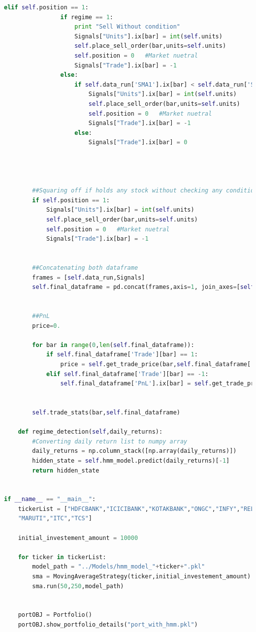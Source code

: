 \documentclass{report}
\begin{document}
\begin{lstlisting}[language=Python]
			elif self.position == 1:
				if regime == 1:
					print "Sell Without condition"
					Signals["Units"].ix[bar] = int(self.units)
					self.place_sell_order(bar,units=self.units)
					self.position = 0   #Market nuetral
					Signals["Trade"].ix[bar] = -1
				else:
					if self.data_run['SMA1'].ix[bar] < self.data_run['SMA2'].ix[bar]:
						Signals["Units"].ix[bar] = int(self.units)
						self.place_sell_order(bar,units=self.units)
						self.position = 0   #Market nuetral
						Signals["Trade"].ix[bar] = -1
					else:
						Signals["Trade"].ix[bar] = 0

			
				
		
		##Squaring off if holds any stock without checking any condition
		if self.position == 1:
			Signals["Units"].ix[bar] = int(self.units)
			self.place_sell_order(bar,units=self.units)
			self.position = 0   #Market nuetral
			Signals["Trade"].ix[bar] = -1


		##Concatenating both dataframe
		frames = [self.data_run,Signals]
		self.final_dataframe = pd.concat(frames,axis=1, join_axes=[self.data_run.index])
		
		
		##PnL
		price=0.
				
		for bar in range(0,len(self.final_dataframe)):
			if self.final_dataframe['Trade'][bar] == 1:
				price = self.get_trade_price(bar,self.final_dataframe['Units'][bar])
			elif self.final_dataframe['Trade'][bar] == -1:
				self.final_dataframe['PnL'].ix[bar] = self.get_trade_price(bar,self.final_dataframe['Units'][bar]) - price 
	

		self.trade_stats(bar,self.final_dataframe)

	def regime_detection(self,daily_returns):
		#Converting daily return list to numpy array
		daily_returns = np.column_stack([np.array(daily_returns)])
		hidden_state = self.hmm_model.predict(daily_returns)[-1]
		return hidden_state


if __name__ == "__main__":
	tickerList = ["HDFCBANK","ICICIBANK","KOTAKBANK","ONGC","INFY","RELIANCE","HDFC","LT","IOC","SBIN","HINDUNILVR",
	"MARUTI","ITC","TCS"]

	initial_investement_amount = 10000

	for ticker in tickerList:
		model_path = "../Models/hmm_model_"+ticker+".pkl"
		sma = MovingAverageStrategy(ticker,initial_investement_amount)
		sma.run(50,250,model_path)


	portOBJ = Portfolio()
	portOBJ.show_portfolio_details("port_with_hmm.pkl")


\end{lstlisting}
\end{document}
